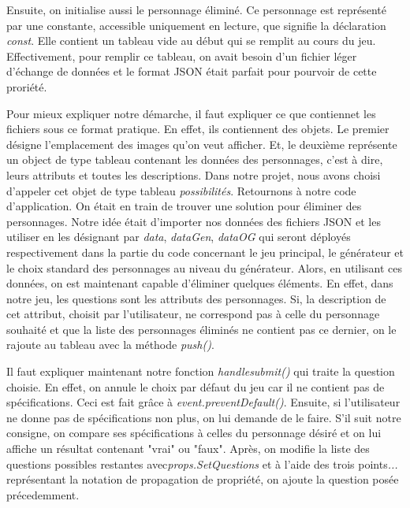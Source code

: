 \documentclass[a4paper, 12pt]{article}
\begin{document}
Ensuite, on initialise aussi le personnage éliminé. Ce personnage est représenté par une constante, accessible uniquement en lecture, que signifie la déclaration \textit{const}. Elle contient un tableau vide au début qui se remplit au cours du jeu. Effectivement, pour remplir ce tableau, on avait besoin d'un fichier léger d'échange de données et le format JSON était parfait pour pourvoir de cette proriété.\newline

Pour mieux expliquer notre démarche, il faut expliquer ce que contiennet les fichiers sous ce format pratique. En effet, ils contiennent des objets. Le premier désigne l'emplacement des images qu'on veut afficher. Et, le deuxième représente un object de type tableau contenant les données des personnages, c'est à dire, leurs attributs et toutes les descriptions. Dans notre projet, nous avons choisi d'appeler cet objet de type tableau \textit{possibilités}. \newline
Retournons à notre code d'application. On était en train de trouver une solution pour éliminer des personnages. Notre idée était d'importer nos données des fichiers JSON et les utiliser en les désignant par \textit{data}, \textit{dataGen}, \textit{dataOG} qui seront déployés respectivement dans la partie du code concernant le jeu principal, le  générateur et le choix standard des personnages au niveau du générateur. \newline
Alors, en utilisant ces données, on est maintenant capable d'éliminer quelques éléments. En effet, dans notre jeu, les questions sont les attributs des personnages. Si, la description de cet attribut, choisit par l'utilisateur, ne correspond pas à celle du personnage souhaité et que la liste des personnages éliminés ne contient pas ce dernier, on le rajoute au tableau avec la méthode  \textit{push()}.\newline

Il faut expliquer maintenant notre fonction  \textit{handlesubmit()}  qui traite la question choisie. En effet, on annule le choix par défaut du jeu car il ne contient pas de spécifications. Ceci est fait grâce à \textit{event.preventDefault()}. Ensuite, si l'utilisateur ne donne pas de spécifications non plus, on lui demande de le faire. S'il suit notre consigne, on compare ses spécifications à celles du personnage désiré et on lui affiche un résultat contenant "vrai" ou "faux". Après, on modifie la liste des questions possibles restantes avec\textit{props.SetQuestions}  et à l'aide des trois points\textit{...} représentant la notation de propagation de propriété, on ajoute la question posée précedemment.\newline
\end{document}
